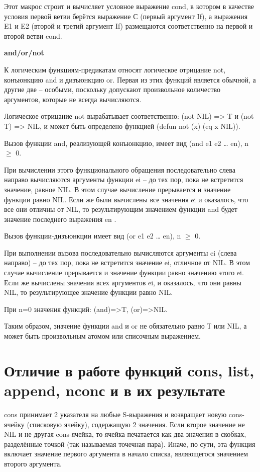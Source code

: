 \documentclass[12pt]{report}
\begin{document}
Этот макрос строит и вычисляет условное выражение cond, в котором в качестве условия первой ветви берётся выражение С (первый аргумент If), а выражения E1 и E2 (второй и третий аргумент If) размещаются соответственно на первой и второй ветви cond.


\textbf{and/or/not}

К логическим функциям-предикатам относят логическое отрицание not, конъюнкцию and и дизъюнкцию or. Первая из этих функций является обычной, а другие две – особыми, поскольку допускают произвольное количество аргументов, которые не всегда вычисляются. 

Логическое отрицание not вырабатывает соответственно: (not NIL) => T и (not T) => NIL, и может быть определено функцией (defun not (x) (eq x NIL)).


Вызов функции and, реализующей конъюнкцию, имеет вид (and e1 e2 … en), n $\geqslant$ 0. 

При вычислении этого функционального обращения последовательно слева направо вычисляются аргументы функции ei – до тех пор, пока не  встретится значение, равное NIL. В этом случае вычисление прерывается и значение функции равно NIL. Если же были вычислены все значения ei и  оказалось, что все они отличны от NIL, то результирующим значением функции and будет значение последнего выражения en .

Вызов функции-дизъюнкции имеет вид (or e1 e2 … en), n $\geqslant$ 0. 

При выполнении вызова последовательно вычисляются аргументы ei (слева направо) – до тех пор, пока не встретится значение ei, отличное от NIL. В этом случае вычисление прерывается и значение функции равно значению этого ei. Если же вычислены значения всех аргументов ei, и оказалось, что они равны NIL, то результирующее значение функции равно NIL.

При n=0 значения функций: (and)=>T, (or)=>NIL.

Таким образом, значение функции and и or не обязательно равно Т или NIL, а может быть произвольным атомом или списочным выражением.




\section*{Отличие в работе функций cons, list, append, nconс и в их результате}

cons принимает 2 указателя на любые S-выражения и возвращает новую cons-ячейку (списковую ячейку), содержащую 2 значения. Если второе значение не NIL и не другая cons-ячейка, то ячейка печатается как два значения в скобках, разделённые точкой (так называемая точечная пара). Иначе, по сути, эта функция включает значение первого аргумента в начало списка, являющегося значением второго аргумента. 
\end{document}
